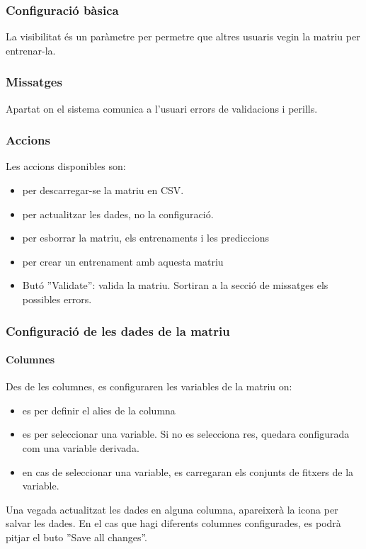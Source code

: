 \subsubsection{Configuració bàsica}
La visibilitat \'{e}s un paràmetre per permetre que altres usuaris vegin la matriu per entrenar-la.

\subsubsection{Missatges} 
Apartat on el sistema comunica a l'usuari errors de validacions i perills.

\subsubsection{Accions} 
Les accions disponibles son:
\begin{itemize} 
\item \icondownload per descarregar-se la matriu en CSV.
\item \iconupdate per actualitzar les dades, no la configuració.
\item \icontrash per esborrar la matriu, els entrenaments i les prediccions
\item \icontraining per crear un entrenament amb aquesta matriu
\item But\'{o} ''Validate'': valida la matriu. Sortiran a la secció de missatges els possibles errors.
\end{itemize}

\phantonsection
\label{matrixConfiguration}
\subsubsection{Configuració de les dades de la matriu}
\paragraph*{Columnes} Des de les columnes, es configuraren les variables de la matriu on:
\begin{itemize}
\item \iconalias es per definir el alies de la columna
\item \iconvariable es per seleccionar una variable. Si no es selecciona res, quedara configurada com una variable derivada.
\item \iconseason en cas de seleccionar una variable, es carregaran els conjunts de fitxers de la variable.
\end{itemize}
Una vegada actualitzat les dades en alguna columna, apareixerà la icona \iconedit per salvar les dades. En el cas que hagi diferents columnes configurades, es podrà pitjar el buto ''Save all changes''.

